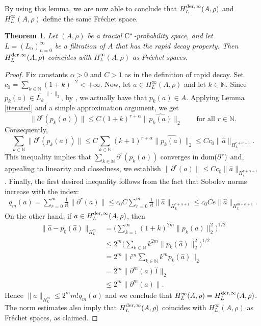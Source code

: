 \documentclass[11pt]{article}
\newtheorem{thm}{Theorem}[section]
\theoremstyle{definition}
\theoremstyle{remark}
\numberwithin{equation}{section}
\numberwithin{equation}{section}
\def\N{\mathbb{N}}
\numberwithin{equation}{section}
\begin{document}
By using this lemma, we are now able to conclude that $H^{{\rm der},\infty}_L(A,\rho)$ and $H^{\infty}_L(A,\rho)$ define the same Fr\'echet space.

\begin{thm}\label{frechet-eq}
    Let $(A,\rho)$ be a tracial ${\rm C}^*$-probability space, and let $L=(L_{n})_{n=0}^{\infty}$ be a filtration of $A$ that has the rapid decay property. Then $H^{{\rm der},\infty}_L(A,\rho)$ coincides with $H^{\infty}_L(A,\rho)$ as Fr\'echet spaces.
\end{thm}
\begin{proof}
    Fix constants $\alpha>0$ and $C>1$ as in the definition of rapid decay. Set $c_0=\sum_{k\in\N}(1+k)^{-2}<+\infty$. Now, let $a\in H^{\infty}_L(A,\rho)$ and let $k\in \N$. Since $p_k(a)\in \overline{L_k}^{\,\|\cdot\|_2}$, by \cite[Corollary 3.7]{HKER25}, we actually have that $p_k(a)\in A$. Applying Lemma \ref{iterated} and a simple approximation argument, we get
    $$
    \|\partial^r(p_k(a))\|\leq C(1+k)^{r+\alpha}\|\widehat{p_k(a)}\|_2\qquad \text{for all } r\in\N.
    $$
    Consequently, 
    $$
    \sum_{k\in\mathbb N}\|\partial^r(p_k(a))\|\leq C\sum_{k\in\mathbb N}
     (k+1)^{r+\alpha}\|\widehat{p_k(a)}\|_2 \leq Cc_0\|\hat a\|_{H_L^{r+\alpha+1}}.
     $$ 
     This inequality implies that $\sum_{k\in \N}\partial^r(p_k(a)) $ converges in ${\rm dom}(\partial^r)$ and, appealing to linearity and closedness, we establish $\|\partial^r(a)\|\leq Cc_0\|\hat a\|_{H_L^{r+\alpha+1}}$. Finally, the first desired inequality follows from the fact that Sobolev norms increase with the index:
     \begin{align*}
         q_m(a)=\sum_{r=0}^m\frac{1}{r!}\|\partial^r(a)\|\leq c_0C\sum_{r=0}^m\frac{1}{r!}\|\hat a\|_{H_L^{r+\alpha+1}}\leq c_0Ce\|\hat a\|_{H_L^{m+\alpha+1}}.
     \end{align*}
On the other hand, if $a\in H^{{\rm der},\infty}_L(A,\rho)$, then 
    \begin{align*}
        \|\hat a-p_0(\hat a)\|_{H^{m}_L}&= \Big(\sum_{k=1}^\infty(1+k)^{2m}\|p_{k}(a)\|_2^2\Big)^{1/2} \\
        &\leq2^m\Big(\sum_{k\in\N}k^{2m}\|p_{k}(\hat a)\|_2^2\Big)^{1/2} \\
        &= 2^m\Big\|i^m\sum_{k\in\N}k^mp_{k}(\hat a)\Big\|_2 \\
        &=2^m\|\partial^m(a)\hat 1\|_2 \\
        &\leq 2^m\|\partial^m(a)\|.
    \end{align*}
    Hence $\|a\|_{H^{m}_L}\leq2^mm!q_m(a)$ and we conclude that $H^{\infty}_L(A,\rho)=H^{{\rm der},\infty}_L(A,\rho)$. The norm estimates also imply that $H^{{\rm der},\infty}_L(A,\rho)$ coincides with $H^{\infty}_L(A,\rho)$ as Fr\'echet spaces, as claimed.
\end{proof}
\end{document}
